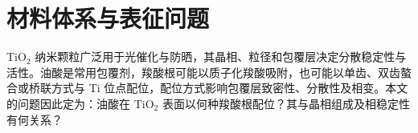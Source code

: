\section{材料体系与表征问题}

TiO$_2$ 纳米颗粒广泛用于光催化与防晒，其晶相、粒径和包覆层决定分散稳定性与活性\cite{sacco2023}。油酸是常用包覆剂，羧酸根可能以质子化羧酸吸附，也可能以单齿、双齿螯合或桥联方式与 Ti 位点配位\cite{lv2013}，配位方式影响包覆层致密性、分散性及相变。本文的问题因此定为：油酸在 TiO$_2$ 表面以何种羧酸根配位？其与晶相组成及相稳定性有何关系？
